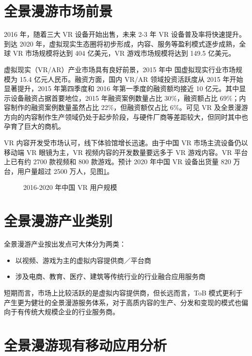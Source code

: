 \section{全景漫游市场前景}

2016 年，随着三大 VR 设备开始出售，未来 2-3 年 VR 设备普及率将快速提升。到达 2020 年，虚拟现实生态圈将初步形成，内容、服务等盈利模式逐步成熟，全球 VR 市场规模将达到 404 亿美元，VR 游戏市场规模将达到 149.5 亿美元。

虚拟现实（VR/AR）产业市场具有良好前景，2015 年中 国虚拟现实行业市场规模为 15.4 亿元人民币。融资方面，国内 VR/AR 领域投资活跃度从 2015 年开始显著提升，2015 年第四季度和 2016 年第一季度的融资额均接近 10 亿元。其中显示设备融资占据首要地位，2015 年融资案例数量占比 30\%，融资额占比 69\%；内容制作的融资案例数量虽然占比 22\%，但融资额仅占比 6\%。可见 VR 及全景漫游方向的内容制作生产领域仍处于起步阶段，与硬件厂商等差距较大，但同时其中也孕育了巨大的商机。

VR 内容开发受市场认可，线下体验馆增长迅速。由于中国 VR 市场主流设备仍以移动端 VR 眼镜为主，VR 视频内容的开发数量要远多于 VR 游戏内容。VR 平台上已有约 2700 款视频和 800 款游戏。预计 2020 年中国 VR 设备出货量 820 万台，用户量超过 2500 万人，见图\ref{fig:market}。

\begin{figure}[htp]
\centering
{}
\caption{2016-2020 年中国 VR 用户规模}
\label{fig:market}
\end{figure}

\section{全景漫游产业类别}
全景漫游产业按出发点可大体分为两类：
\begin{itemize}
	\item 以视频、游戏为主的虚拟内容提供商／平台商
	\item 涉及电商、教育、医疗、建筑等传统行业的行业融合应用服务商
\end{itemize}

短期而言，市场上比较活跃的是虚拟内容提供商，但长远而言，ToB 模式更利于产生更为健壮的全景漫游服务体系，对于高质内容的生产、分发和变现的模式也偏向于有传统大规模企业的行业服务商。

\section{全景漫游现有移动应用分析}


